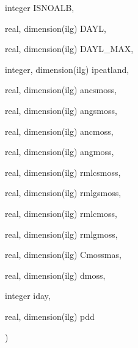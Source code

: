 {\begin{DoxyParamCaption}
\item[{integer}]{I\+S\+N\+O\+A\+L\+B, }
\item[{real, dimension(ilg)}]{D\+A\+Y\+L, }
\item[{real, dimension(ilg)}]{D\+A\+Y\+L\+\_\+\+M\+A\+X, }
\item[{integer, dimension(ilg)}]{ipeatland, }
\item[{real, dimension(ilg)}]{ancsmoss, }
\item[{real, dimension(ilg)}]{angsmoss, }
\item[{real, dimension(ilg)}]{ancmoss, }
\item[{real, dimension(ilg)}]{angmoss, }
\item[{real, dimension(ilg)}]{rmlcsmoss, }
\item[{real, dimension(ilg)}]{rmlgsmoss, }
\item[{real, dimension(ilg)}]{rmlcmoss, }
\item[{real, dimension(ilg)}]{rmlgmoss, }
\item[{real, dimension(ilg)}]{Cmossmas, }
\item[{real, dimension(ilg)}]{dmoss, }
\item[{integer}]{iday, }
\item[{real, dimension(ilg)}]{pdd}
\end{DoxyParamCaption}
)}\label{CLASST_8f_afc821376816034a0c657e69bb4b06a24}

